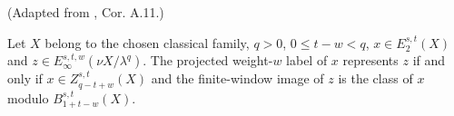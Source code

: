 \begin{theorem}
\label{frontier:Literature:dd88947b5ffc}
(Adapted from \cite{BHS}, Cor. A.11.)\par{}

Let $X$ belong to the chosen classical family, $q>0$, $0\le t-w<q$, $x\in E_2^{s,t}(X)$ and $z\in E_\infty^{s,t,w}(\nu X/\lambda^q)$. The projected weight-$w$ label of $x$ represents $z$ if and only if $x\in Z_{q-t+w}^{s,t}(X)$ and the finite-window image of $z$ is the class of $x$ modulo $B_{1+t-w}^{s,t}(X)$.
\end{theorem}

